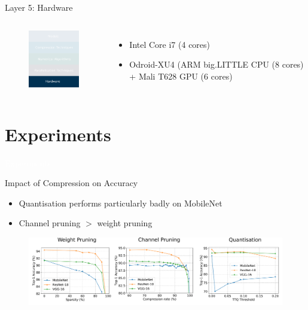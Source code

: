 \documentclass[xcolor=dvipsnames]{beamer}
\begin{document}
\begin{frame}{Layer 5: Hardware}

\begin{columns}


\begin{figure}
    \centering
    \includegraphics[width=3.5cm]{images/hardwares.pdf}
\end{figure}


\begin{itemize}
    \item Intel Core i7 (4 cores)
    \item Odroid-XU4 (ARM big.LITTLE CPU (8 cores) + Mali T628 GPU (6 cores)
\end{itemize}
\end{columns}


\end{frame}




\section{Experiments}

{
\begin{frame}
    \centering
    \textcolor{white}{\LARGE Experiments}
\end{frame}
}

\begin{frame}{Impact of Compression on Accuracy}

\begin{itemize}
    \item Quantisation performs particularly badly on MobileNet
    \item Channel pruning $>$ weight pruning
\end{itemize}
    
\vspace{0.5cm}
\begin{figure}
    \centering
    \includegraphics[width=1.08\linewidth]{images/accuracies.pdf}
\end{figure}
    
\end{frame}
\end{document}
